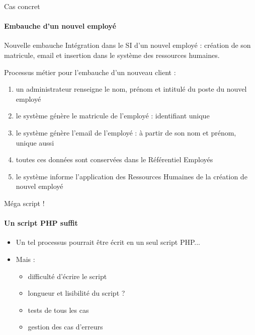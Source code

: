 \documentclass[compress]{beamer}%
\begin{document}
\begin{frame}{Cas concret}
	\framesubtitle{Embauche d'un nouvel employé}
	
	\begin{exampleblock}{Nouvelle embauche}
	Intégration dans le SI d'un nouvel employé : création de son matricule, email et insertion dans le système des ressources humaines.
	\end{exampleblock}
	
	\pause
	Processus métier pour l'embauche d'un nouveau client :
	\begin{enumerate}[<+->]
		\item un administrateur renseigne le nom, prénom et intitulé du poste du nouvel employé
		\item le système génère le matricule de l'employé : identifiant unique
		\item le système génère l'email de l'employé : à partir de son nom et prénom, unique aussi
		\item toutes ces données sont conservées dans le Référentiel Employés
		\item le système informe l'application des Ressources Humaines de la création de nouvel employé
	\end{enumerate}	
	
\end{frame}

\begin{frame}{Méga script !}
	\framesubtitle{Un script PHP suffit}
	
	\begin{itemize}[<+->]
	\item Un tel processus pourrait être écrit en un seul script PHP...\\
	\item Mais :
	\begin{itemize}[<+->]
	\item difficulté d'écrire le script
	\item longueur et lisibilité du script ?
	\item tests de tous les cas
	\item gestion des cas d'erreurs
	\end{itemize}
	\end{itemize}
	
\end{frame}
\end{document}
